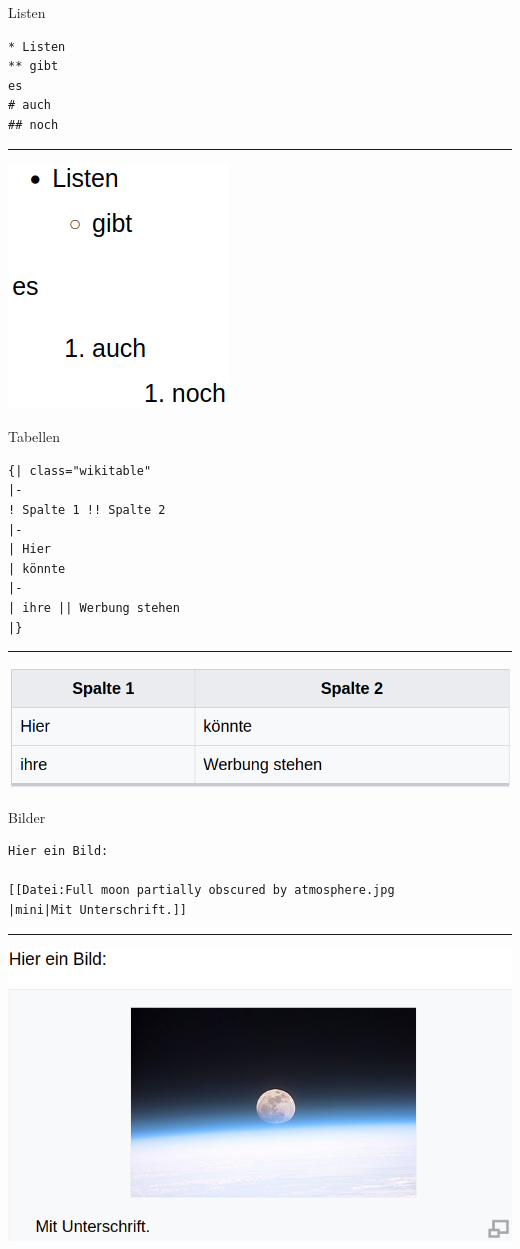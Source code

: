 \documentclass{beamer}
\begin{document}
	\begin{frame}[fragile]{Listen}
		\begin{verbatim}
* Listen
** gibt
es
# auch
## noch
		\end{verbatim}
		\hrule\n
		\includegraphics[scale=0.35]{images/wikitext-example-4-lists.png}
	\end{frame}

	\begin{frame}[fragile]{Tabellen}
		\footnotesize
		\begin{verbatim}
{| class="wikitable"
|-
! Spalte 1 !! Spalte 2
|-
| Hier
| könnte
|-
| ihre || Werbung stehen
|}
		\end{verbatim}
		\hrule\n
		\includegraphics[scale=0.35]{images/wikitext-example-5-table.png}
	\end{frame}

	\begin{frame}[fragile]{Bilder}
		\begin{verbatim}
Hier ein Bild:

[[Datei:Full moon partially obscured by atmosphere.jpg
|mini|Mit Unterschrift.]]
		\end{verbatim}
		\hrule\n
		\includegraphics[scale=0.35]{images/wikitext-example-6-image.png}
	\end{frame}
	
\end{document}
